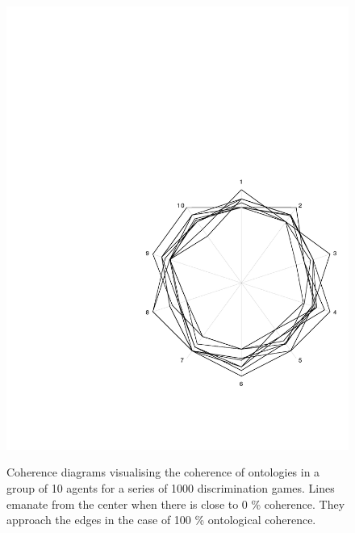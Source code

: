 \begin{figure}[h]
{ \includegraphics[width=.32\textwidth]{chap7/figs/com10.pdf}
}

\caption{\label{cohweb}Coherence diagrams visualising
the coherence of ontologies in a group of 10 agents for
a series of 1000 discrimination games. Lines emanate 
from the center when there is close to 0 \% coherence. They approach the
edges in the case of 100 \% ontological coherence.}
\end{figure}

